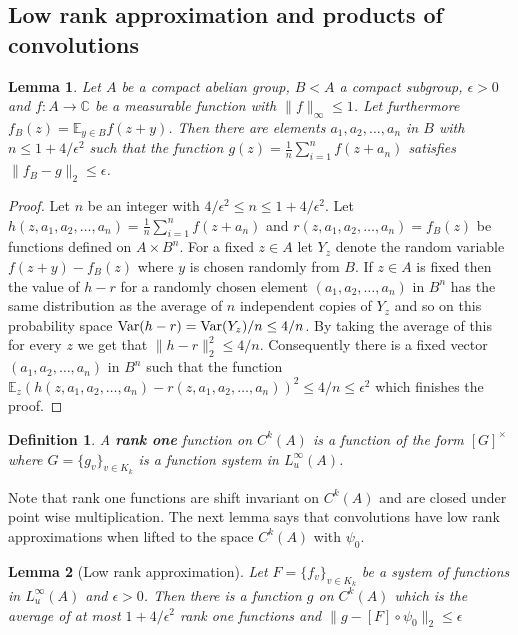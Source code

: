 \documentclass [11pt] {article}
\newtheorem{lemma}{Lemma}[section]
\newtheorem{definition}{Definition}[section]
\begin{document}
\subsection{Low rank approximation and products of convolutions}

\begin{lemma}\label{shiftap} Let $A$ be a compact abelian group, $B<A$ a compact subgroup, $\epsilon>0$ and $f:A\rightarrow\mathbb{C}$ be a measurable function with $\|f\|_\infty\leq 1$. Let furthermore $f_B(z)=\mathbb{E}_{y\in B}f(z+y)$. Then there are elements $a_1,a_2,\dots,a_n$ in $B$ with $n\leq 1+4/\epsilon^2$ such that the function $g(z)=\frac{1}{n}\sum_{i=1}^n f(z+a_n)$ satisfies $\|f_B-g\|_2\leq\epsilon$.
\end{lemma}

\begin{proof} Let $n$ be an integer with $4/\epsilon^2\leq n\leq 1+4/\epsilon^2$. Let $h(z,a_1,a_2,\dots,a_n)=\frac{1}{n}\sum_{i=1}^nf(z+a_n)$ and $r(z,a_1,a_2,\dots,a_n)=f_B(z)$ be functions defined on $A\times B^n$. For a fixed $z\in A$ let $Y_z$ denote the random variable $f(z+y)-f_B(z)$ where $y$ is chosen randomly from $B$. If $z\in A$ is fixed then the value of $h-r$ for a randomly chosen element $(a_1,a_2,\dots,a_n)$ in $B^n$ has the same distribution as the average of $n$ independent copies of $Y_z$ and so on this probability space ${\rm Var}(h-r)={\rm Var}(Y_z)/n\leq 4/n$.
By taking the average of this for every $z$ we get that
$\|h-r\|_2^2\leq 4/n$. Consequently there is a fixed vector $(a_1,a_2,\dots,a_n)$ in $B^n$ such that
the function $\mathbb{E}_z(h(z,a_1,a_2,\dots,a_n)-r(z,a_1,a_2,\dots,a_n))^2\leq 4/n\leq\epsilon^2$ which finishes the proof.
\end{proof}

\medskip

\begin{definition}\label{rankone}  A {\bf rank one} function on $C^k(A)$ is a function of the form $[G]^\times$ where $G=\{g_v\}_{v\in K_k}$ is a function system in $L^\infty_u(A)$.
\end{definition}

Note that rank one functions are shift invariant on $C^k(A)$ and are closed under point wise multiplication.
The next lemma says that convolutions have low rank approximations when lifted to the space $C^k(A)$ with $\psi_0$. 

\begin{lemma}[Low rank approximation]\label{lowrank} Let $F=\{f_v\}_{v\in K_k}$ be a system of functions in $L^\infty_u(A)$ and $\epsilon>0$. Then there is a function $g$ on $C^k(A)$ which is the average of at most $1+4/\epsilon^2$ rank one functions and $\|g-[F]\circ\psi_0\|_2\leq\epsilon$ 
\end{lemma}
\end{document}
